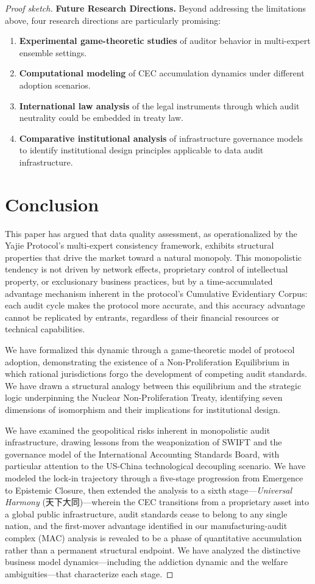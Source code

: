 \documentclass[12pt,a4paper]{ctexart}
\theoremstyle{definition}
\theoremstyle{remark}
\begin{document}
\begin{proof}[Proof sketch]
\textbf{Future Research Directions.} Beyond addressing the limitations above, four research directions are particularly promising:
\begin{enumerate}
\item \textbf{Experimental game-theoretic studies} of auditor behavior in multi-expert ensemble settings.
\item \textbf{Computational modeling} of CEC accumulation dynamics under different adoption scenarios.
\item \textbf{International law analysis} of the legal instruments through which audit neutrality could be embedded in treaty law.
\item \textbf{Comparative institutional analysis} of infrastructure governance models to identify institutional design principles applicable to data audit infrastructure.
\end{enumerate}

\section{Conclusion}

This paper has argued that data quality assessment, as operationalized by the Yajie Protocol's multi-expert consistency framework, exhibits structural properties that drive the market toward a natural monopoly. This monopolistic tendency is not driven by network effects, proprietary control of intellectual property, or exclusionary business practices, but by a time-accumulated advantage mechanism inherent in the protocol's Cumulative Evidentiary Corpus: each audit cycle makes the protocol more accurate, and this accuracy advantage cannot be replicated by entrants, regardless of their financial resources or technical capabilities.

We have formalized this dynamic through a game-theoretic model of protocol adoption, demonstrating the existence of a Non-Proliferation Equilibrium in which rational jurisdictions forgo the development of competing audit standards. We have drawn a structural analogy between this equilibrium and the strategic logic underpinning the Nuclear Non-Proliferation Treaty, identifying seven dimensions of isomorphism and their implications for institutional design.

We have examined the geopolitical risks inherent in monopolistic audit infrastructure, drawing lessons from the weaponization of SWIFT and the governance model of the International Accounting Standards Board, with particular attention to the US-China technological decoupling scenario. We have modeled the lock-in trajectory through a five-stage progression from Emergence to Epistemic Closure, then extended the analysis to a sixth stage—\textit{Universal Harmony} (天下大同)—wherein the CEC transitions from a proprietary asset into a global public infrastructure, audit standards cease to belong to any single nation, and the first-mover advantage identified in our manufacturing-audit complex (MAC) analysis is revealed to be a phase of quantitative accumulation rather than a permanent structural endpoint. We have analyzed the distinctive business model dynamics—including the addiction dynamic and the welfare ambiguities—that characterize each stage.


\end{proof}
\end{document}

